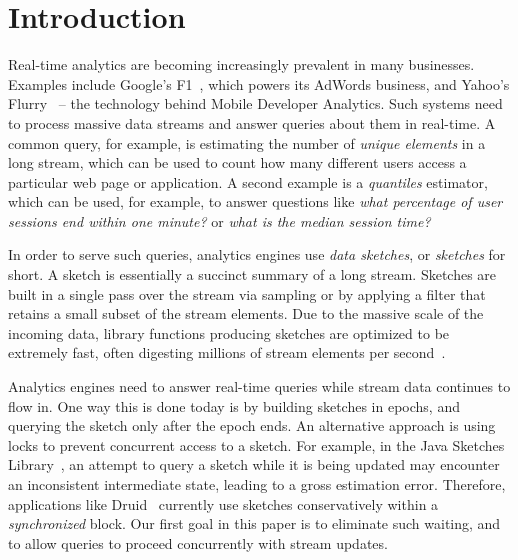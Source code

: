
\section{Introduction}


Real-time analytics are becoming increasingly prevalent in many businesses. 
Examples include Google's F1~\cite{Shute2013}, which powers its AdWords
business, and Yahoo's Flurry~\cite{flurry} --
the technology behind Mobile Developer Analytics.
Such systems need to process massive data streams and answer queries about them in real-time.
A common query, for example, is estimating the number of \emph{unique elements} in a long stream, which 
can be used to count how many different users access a particular web page or application. 
A second example is a \emph{quantiles} estimator, which can be used, for example, to  answer questions like  \emph{what percentage of user sessions end within one minute?} or \emph{what is the median session time?}

In order to serve such queries, analytics engines use 
\emph{data sketches}, or \emph{sketches} for short. A sketch is essentially 
a succinct summary of a long stream. 
Sketches are built in a single pass over the stream via sampling or by applying a filter 
that retains a small subset  of the stream elements. 
Due to the massive scale of the incoming data,   library functions producing sketches
are optimized to be extremely fast, often digesting millions of stream elements per second~\cite{sketchesLibrary}. 


 Analytics engines need to answer real-time queries while  stream data continues to flow in.
 One way this is done 
today is by building sketches in epochs, and querying the sketch only after
 the epoch ends. An alternative approach is using locks to prevent concurrent access to a sketch.
 For example, in the Java Sketches Library~\cite{sketchesLibrary},  an 
attempt to query a sketch  while it is being updated  may encounter an inconsistent
intermediate state, leading to a gross estimation error. Therefore, applications like Druid~\cite{Druid}
currently use sketches conservatively within a \emph{synchronized} block.
Our first goal in this paper is to eliminate such waiting, and to allow queries to proceed 
concurrently with stream updates. 


